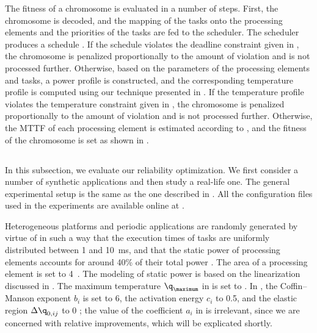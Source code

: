 The fitness of a chromosome is evaluated in a number of steps. First, the
chromosome is decoded, and the mapping of the tasks onto the processing elements
and the priorities of the tasks are fed to the scheduler. The scheduler produces
a schedule \schedule. If the schedule violates the deadline constraint given in
, the chromosome is penalized proportionally
to the amount of violation and is not processed further. Otherwise, based on the
parameters of the processing elements and tasks, a power profile \mp is
constructed, and the corresponding temperature profile \mq is computed using our
technique presented in . If the temperature
profile violates the temperature constraint given in
, the chromosome is penalized proportionally
to the amount of violation and is not processed further. Otherwise, the
\ac{MTTF} of each processing element is estimated according to
, and the fitness of the chromosome is set as
shown in .

\subsection{\resultstitle}

In this subsection, we evaluate our reliability optimization. We first consider
a number of synthetic applications and then study a real-life one. The general
experimental setup is the same as the one described in
. All the configuration files used in the
experiments are available online at \cite{eslab2012}.

Heterogeneous platforms and periodic applications are randomly generated by
virtue of  \cite{dick1998} in such a way that the execution times of
tasks are uniformly distributed between 1 and 10~ms, and that the static power
of processing elements accounts for around 40\% of their total power
\cite{liu2007}. The area of a processing element is set to 4~. The
modeling of static power is based on the linearization discussed in
. The maximum temperature $\q_\maximum$ in
 is set to . In
, the Coffin--Manson exponent $b_i$ is set to
6, the activation energy $c_i$ to 0.5, and the elastic region $\Delta\q_{0, ij}$
to 0 \cite{jedec2016}; the value of the coefficient $a_i$ in
 is irrelevant, since we are concerned with
relative improvements, which will be explicated shortly.

